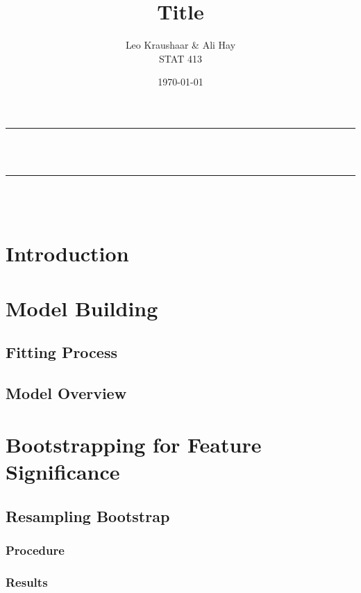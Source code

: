 \documentclass[12pt]{article}
\title{Title}
\author{Leo Kraushaar \& Ali Hay \\ STAT 413}
\date{\today}
\begin{document}
\onehalfspacing

\begin{titlepage}
    \newcommand{\HRule}{\rule{\linewidth}{0.5mm}}
    \center
    
    \HRule \\[1cm]
    { \huge \bfseries \thetitle}\\[0.4cm] 
    \HRule \\[1.8cm]
    
    \Large \thedate\\[5cm]
    
    \begin{minipage}{1\textwidth}
    \vspace{10cm}
    \begin{flushleft} \large
    \theauthor
    \end{flushleft}

    \end{minipage}

    
\end{titlepage}

\newpage
\section{Introduction}

\newpage
\section{Model Building}
\subsection{Fitting Process}
\subsection{Model Overview}

\newpage
\section{Bootstrapping for Feature Significance}
\subsection{Resampling Bootstrap}
\subsubsection*{Procedure}
\subsubsection*{Results}
\end{document}

